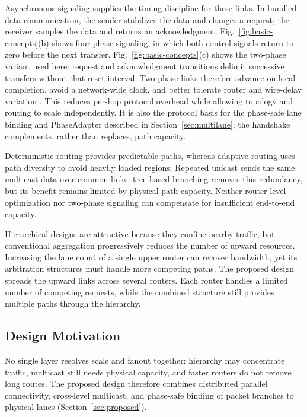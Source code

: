 \documentclass[conference]{IEEEtran}
\begin{document}
Asynchronous signaling supplies the timing discipline for these links. In
bundled-data communication, the sender stabilizes the data and changes a
request; the receiver samples the data and returns an acknowledgment.
Fig.~\ref{fig:basic-concepts}(b) shows four-phase signaling, in which both
control signals return to zero before the next transfer. Fig.~\ref{fig:basic-concepts}(c)
shows the two-phase variant used here: request and acknowledgment transitions
delimit successive transfers without that reset interval. Two-phase links
therefore advance on local completion, avoid a network-wide clock, and better
tolerate router and wire-delay variation
\cite{ghiribaldi2013transition,jiang2017async14nm,zhang2026reusable}.
This reduces per-hop protocol overhead while allowing topology and routing to
scale independently. It is also the protocol basis for the phase-safe lane
binding and PhaseAdapter described in Section~\ref{sec:multilane}; the
handshake complements, rather than replaces, path capacity.

Deterministic routing provides predictable paths, whereas adaptive routing
uses path diversity to avoid heavily loaded regions. Repeated unicast sends
the same multicast data over common links; tree-based branching removes this
redundancy, but its benefit remains limited by physical path capacity.
Neither router-level optimization nor two-phase signaling can compensate for
insufficient end-to-end capacity.

Hierarchical designs are attractive because they confine nearby traffic,
but conventional aggregation progressively reduces the number of upward
resources. Increasing the lane count of a single upper router can recover
bandwidth, yet its arbitration structures must handle more competing paths.
The proposed design spreads the upward links across several routers. Each
router handles a limited number of competing requests, while the combined
structure still provides multiple paths through the hierarchy.

\subsection{Design Motivation}\label{sec:motivation}

No single layer resolves scale and fanout together: hierarchy may
concentrate traffic, multicast still needs physical capacity, and faster
routers do not remove long routes. The proposed design therefore combines
distributed parallel connectivity, cross-level multicast, and phase-safe
binding of packet branches to physical lanes (Section~\ref{sec:proposed}).
\end{document}
